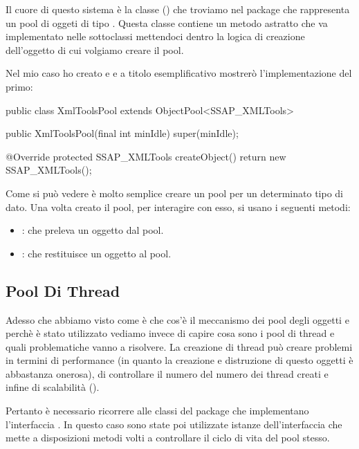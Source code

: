 Il cuore di questo sistema è la classe  (\cite{objectpool}) che troviamo nel package  che rappresenta un pool di oggeti di tipo . Questa classe contiene un metodo astratto  che va implementato nelle sottoclassi mettendoci dentro la logica di creazione dell'oggetto di cui volgiamo creare il pool.

Nel mio caso ho creato  e  e a titolo esemplificativo mostrerò l'implementazione del primo:

\begin{java}[caption={Implementazione di ObjectPool},label={lst:objectPool}]
public class XmlToolsPool extends ObjectPool<SSAP_XMLTools>{
	
	public XmlToolsPool(final int minIdle) {
		super(minIdle);
	}

	@Override
	protected SSAP_XMLTools createObject() {
		return new SSAP_XMLTools();
	}
}
\end{java}

\noindent
Come si può vedere è molto semplice creare un pool per un determinato tipo di dato. Una volta creato il pool, per interagire con esso, si usano i seguenti metodi:

\begin{itemize}
	\item {}: che preleva un oggetto dal pool.
	\item {}: che restituisce un oggetto al pool.
\end{itemize}

\subsection{Pool Di Thread}

Adesso che abbiamo visto come è che cos'è il meccanismo dei pool degli oggetti e perchè è stato utilizzato vediamo invece di capire cosa sono i pool di thread e quali problematiche vanno a risolvere.
La creazione di thread può creare problemi in termini di performance (in quanto la creazione e distruzione di questo oggetti è abbastanza onerosa), di controllare il numero del numero dei thread creati e infine di scalabilità (\cite{vetti2008}).

Pertanto è necessario ricorrere alle classi del package  che implementano l'interfaccia . In questo caso sono state poi utilizzate istanze dell'interfaccia  che mette a disposizioni metodi volti a controllare il ciclo di vita del pool stesso.

